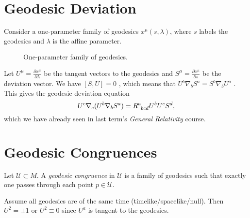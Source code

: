 \section{Geodesic Deviation}%
\label{sec:geodesic_deviation}

Consider a one-parameter family of geodesics $x^{\mu}(s, \lambda)$, where $s$ labels the geodesics and $\lambda$ is the affine parameter.
\begin{figure}[tbhp]
  \centering
  \def\svgwidth{0.4\columnwidth}
  
  \caption{One-parameter family of geodesics.}
  \label{fig:l9f1}
\end{figure}

Let $U^{\mu} = \frac{\partial x^{\mu}}{\partial \lambda}$ be the tangent vectors to the geodesics and $S^{\mu} = \frac{\partial x^{\mu}}{\partial s}$  be the deviation vector.
We have $[S, U] = 0$ , which means that $U^{b} \nabla_b S^{a} = S^{b} \nabla_b U^{a}$ . This gives the geodesic deviation equation
\begin{equation}
  U^c \nabla_c (U^b \nabla_b S^a) = R\indices{^{a}_{bcd}} U^{b} U^{c} S^{d},
\end{equation}
which we have already seen in last term's \emph{General Relativity} course.

\section{Geodesic Congruences}%
\label{sec:geodesic_congruences}

\begin{definition}[]
  Let $\mathcal{U} \subset M$. A \emph{geodesic congruence} in $\mathcal{U}$ is a family of geodesics such that exactly one passes through each point $p \in \mathcal{U}$.
\end{definition}
Assume all geodesics are of the same time (timelike/spacelike/null).
Then $U^2 = \pm 1$  or $U^2 \equiv 0$ since  $U^a$  is tangent to the geodesics.

